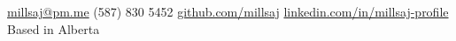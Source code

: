 
\nobreakvspace{0.3em}  %

\noindent\href{mailto:millsaj@pm.me}{millsaj\mbox{}@\mbox{}pm.me}\sbull
(587) 830 5452\sbull
\href{https://github.com/millsaj}{github.com/millsaj}\sbull
\href{https://linkedin.com/in/millsaj-profile}{linkedin.com/in/millsaj-profile}\sbull
Based in Alberta
